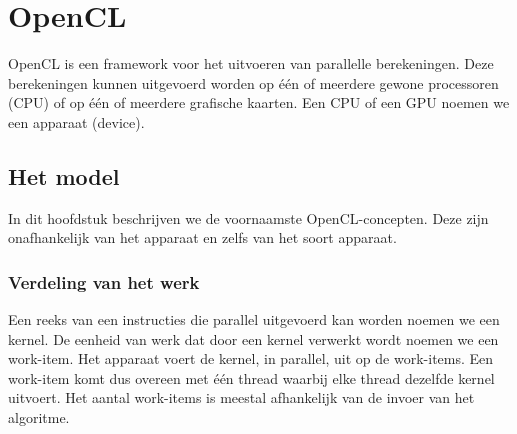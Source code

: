 \chapter{OpenCL}
\label{h:opencl} 

OpenCL is een framework voor het uitvoeren van parallelle berekeningen. Deze berekeningen kunnen uitgevoerd worden op \'e\'en of meerdere gewone processoren (CPU) of op \'e\'en of meerdere grafische kaarten. Een CPU of een GPU noemen we een apparaat (device).

\section{Het model}
In dit hoofdstuk beschrijven we de voornaamste OpenCL-concepten. Deze zijn onafhankelijk van het apparaat en zelfs van het soort apparaat.
\subsection{Verdeling van het werk}
Een reeks van een instructies die parallel uitgevoerd kan worden noemen we een kernel. De eenheid van werk dat door een kernel verwerkt wordt noemen we een work-item. Het apparaat voert de kernel, in parallel, uit op de work-items. Een work-item komt dus overeen met \'e\'en thread waarbij elke thread dezelfde kernel uitvoert. Het aantal work-items is meestal afhankelijk van de invoer van het algoritme.

